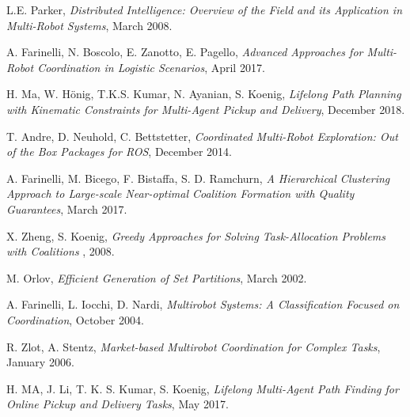 \begin{thebibliography}{99}
     L.E. Parker, \emph{Distributed Intelligence: Overview of the Field and its
    Application in Multi-Robot Systems}, March 2008.

     A. Farinelli, N. Boscolo, E. Zanotto, E. Pagello,
    \emph{Advanced Approaches for Multi-Robot Coordination in
    Logistic Scenarios}, April 2017.

     H. Ma, W. Hönig, T.K.S. Kumar, N. Ayanian, S. Koenig,
    \emph{Lifelong Path Planning with Kinematic Constraints
    for Multi-Agent Pickup and Delivery}, December 2018.

     T. Andre, D. Neuhold, C. Bettstetter,
    \emph{Coordinated Multi-Robot Exploration:
    Out of the Box Packages for ROS}, December 2014.

     A. Farinelli, M. Bicego, F. Bistaffa, S. D. Ramchurn,
    \emph{A Hierarchical Clustering Approach to Large-scale
    Near-optimal Coalition Formation with Quality
    Guarantees}, March 2017.

     X. Zheng, S. Koenig,
    \emph{Greedy Approaches for Solving Task-Allocation Problems with Coalitions}
    , 2008.

     M. Orlov,
    \emph{Efficient Generation of Set Partitions}, March 2002.

     A. Farinelli, L. Iocchi, D. Nardi,
    \emph{Multirobot Systems: A Classification
    Focused on Coordination}, October 2004.

     R. Zlot, A. Stentz, 
    \emph{Market-based Multirobot Coordination for Complex Tasks}, January 2006.

     H. MA, J. Li, T. K. S. Kumar, S. Koenig,
    \emph{Lifelong Multi-Agent Path Finding
    for Online Pickup and Delivery Tasks}, May 2017.
    
\end{thebibliography}
